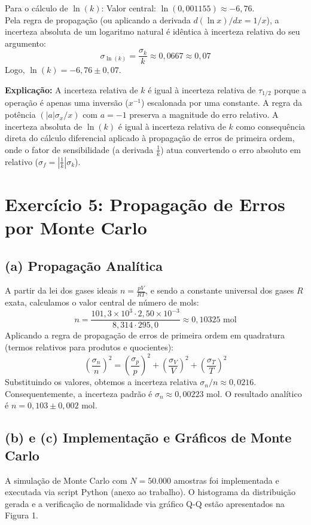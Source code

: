 \documentclass{article}
\begin{document}
Para o cálculo de $\ln(k)$:
Valor central: $\ln(0,001155) \approx -6,76$. \\
Pela regra de propagação (ou aplicando a derivada $d(\ln x)/dx = 1/x$), a incerteza absoluta de um logaritmo natural é idêntica à incerteza relativa do seu argumento:
\[ \sigma_{\ln(k)} = \frac{\sigma_k}{k} \approx 0,0667 \approx 0,07 \]
Logo, $\ln(k) = -6,76 \pm 0,07$.

\textbf{Explicação:} A incerteza relativa de $k$ é igual à incerteza relativa de $\tau_{1/2}$ porque a operação é apenas uma inversão ($x^{-1}$) escalonada por uma constante. A regra da potência $(|a|\sigma_x/x)$ com $a = -1$ preserva a magnitude do erro relativo. A incerteza absoluta de $\ln(k)$ é igual à incerteza relativa de $k$ como consequência direta do cálculo diferencial aplicado à propagação de erros de primeira ordem, onde o fator de sensibilidade (a derivada $\frac{1}{k}$) atua convertendo o erro absoluto em relativo ($\sigma_f = |\frac{1}{k}|\sigma_k$).

\section*{Exercício 5: Propagação de Erros por Monte Carlo}

\subsection*{(a) Propagação Analítica}
A partir da lei dos gases ideais $n = \frac{pV}{RT}$, e sendo a constante universal dos gases $R$ exata, calculamos o valor central de número de mols:
\[ n = \frac{101,3 \times 10^3 \cdot 2,50 \times 10^{-3}}{8,314 \cdot 295,0} \approx 0,10325 \text{ mol} \]
Aplicando a regra de propagação de erros de primeira ordem em quadratura (termos relativos para produtos e quocientes):
\[ \left(\frac{\sigma_n}{n}\right)^2 = \left(\frac{\sigma_p}{p}\right)^2 + \left(\frac{\sigma_V}{V}\right)^2 + \left(\frac{\sigma_T}{T}\right)^2 \]
Substituindo os valores, obtemos a incerteza relativa $\sigma_n/n \approx 0,0216$. Consequentemente, a incerteza padrão é $\sigma_n \approx 0,00223 \text{ mol}$. O resultado analítico é $n = 0,103 \pm 0,002 \text{ mol}$.

\subsection*{(b) e (c) Implementação e Gráficos de Monte Carlo}
A simulação de Monte Carlo com $N = 50.000$ amostras foi implementada e executada via script Python (anexo ao trabalho). O histograma da distribuição gerada e a verificação de normalidade via gráfico Q-Q estão apresentados na Figura 1.
\end{document}
